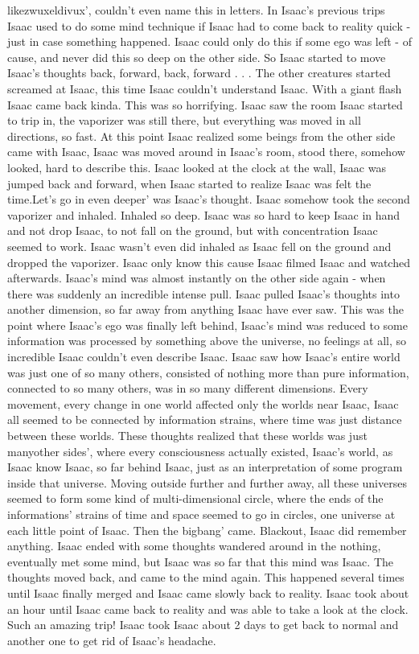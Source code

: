 \documentclass[12pt]{book}
\begin{document}
likezwuxeldivux', couldn't even name this in letters. In Isaac's previous trips Isaac used to do some mind technique if Isaac had to come back to reality quick - just in case something happened. Isaac could only do this if some ego was left - of cause, and never did this so deep on the other side. So Isaac started to move Isaac's thoughts back, forward, back, forward . . .  The other creatures started screamed at Isaac, this time Isaac couldn't understand Isaac. With a giant flash Isaac came back kinda. This was so horrifying. Isaac saw the room Isaac started to trip in, the vaporizer was still there, but everything was moved in all directions, so fast. At this point Isaac realized some beings from the other side came with Isaac, Isaac was moved around in Isaac's room, stood there, somehow looked, hard to describe this. Isaac looked at the clock at the wall, Isaac was jumped back and forward, when Isaac started to realize Isaac was felt the time.Let's go in even deeper' was Isaac's thought. Isaac somehow took the second vaporizer and inhaled. Inhaled so deep. Isaac was so hard to keep Isaac in hand and not drop Isaac, to not fall on the ground, but with concentration Isaac seemed to work. Isaac wasn't even did inhaled as Isaac fell on the ground and dropped the vaporizer. Isaac only know this cause Isaac filmed Isaac and watched afterwards. Isaac's mind was almost instantly on the other side again - when there was suddenly an incredible intense pull. Isaac pulled Isaac's thoughts into another dimension, so far away from anything Isaac have ever saw. This was the point where Isaac's ego was finally left behind, Isaac's mind was reduced to some information was processed by something above the universe, no feelings at all, so incredible Isaac couldn't even describe Isaac. Isaac saw how Isaac's entire world was just one of so many others, consisted of nothing more than pure information, connected to so many others, was in so many different dimensions. Every movement, every change in one world affected only the worlds near Isaac, Isaac all seemed to be connected by information strains, where time was just distance between these worlds. These thoughts realized that these worlds was just manyother sides', where every consciousness actually existed, Isaac's world, as Isaac know Isaac, so far behind Isaac, just as an interpretation of some program inside that universe. Moving outside further and further away, all these universes seemed to form some kind of multi-dimensional circle, where the ends of the informations' strains of time and space seemed to go in circles, one universe at each little point of Isaac. Then the bigbang' came. Blackout, Isaac did remember anything. Isaac ended with some thoughts wandered around in the nothing, eventually met some mind, but Isaac was so far that this mind was Isaac. The thoughts moved back, and came to the mind again. This happened several times until Isaac finally merged and Isaac came slowly back to reality. Isaac took about an hour until Isaac came back to reality and was able to take a look at the clock. Such an amazing trip! Isaac took Isaac about 2 days to get back to normal and another one to get rid of Isaac's headache.
\end{document}
